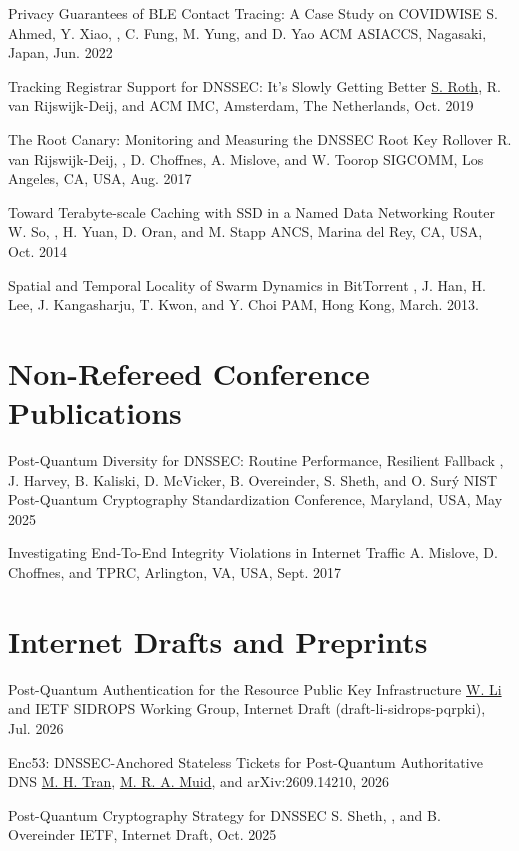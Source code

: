 \documentclass[10pt,letter,sans]{moderncv}        %
\begin{document}
{Privacy Guarantees of BLE Contact Tracing: A Case Study on COVIDWISE}
{S. Ahmed, Y. Xiao, \myself, C. Fung, M. Yung, and D. Yao}
{ACM ASIACCS, Nagasaki, Japan, Jun. 2022}

{Tracking Registrar Support for DNSSEC: It's Slowly Getting Better}
{\underline{S. Roth}, R. van Rijswijk-Deij, and \myself}
{ACM IMC, Amsterdam, The Netherlands, Oct. 2019}

{The Root Canary: Monitoring and Measuring the DNSSEC Root Key Rollover}
{R. van Rijswijk-Deij, \myself, D. Choffnes, A. Mislove, and W. Toorop}
{SIGCOMM, Los Angeles, CA, USA, Aug. 2017}

{Toward Terabyte-scale Caching with SSD in a Named Data Networking Router}
{W. So, \myself, H. Yuan, D. Oran, and M. Stapp}
{ANCS, Marina del Rey, CA, USA, Oct. 2014 }

{Spatial and Temporal Locality of Swarm Dynamics in BitTorrent}
{\myself, J. Han, H. Lee, J. Kangasharju, T. Kwon, and Y. Choi}
{PAM, Hong Kong, March. 2013.}

\section{Non-Refereed Conference Publications}
{Post-Quantum Diversity for DNSSEC: Routine Performance, Resilient Fallback}
{\myself, J. Harvey, B. Kaliski, D. McVicker, B. Overeinder, S. Sheth, and O. Sur\'y}
{NIST Post-Quantum Cryptography Standardization Conference, Maryland, USA, May 2025}

{Investigating End-To-End Integrity Violations in Internet Traffic}
{A. Mislove, D. Choffnes, and \myself}
{TPRC, Arlington, VA, USA, Sept. 2017}

\section{Internet Drafts and Preprints}
{Post-Quantum Authentication for the Resource Public Key Infrastructure}
{\underline{W. Li} and \myself}
{IETF SIDROPS Working Group, Internet Draft (draft-li-sidrops-pqrpki), Jul. 2026}

{Enc53: DNSSEC-Anchored Stateless Tickets for Post-Quantum Authoritative DNS}
{\underline{M. H. Tran}, \underline{M. R. A. Muid}, and \myself}
{arXiv:2609.14210, 2026}

{Post-Quantum Cryptography Strategy for DNSSEC}
{S. Sheth, \myself, and B. Overeinder}
{IETF, Internet Draft, Oct. 2025}
\end{document}
